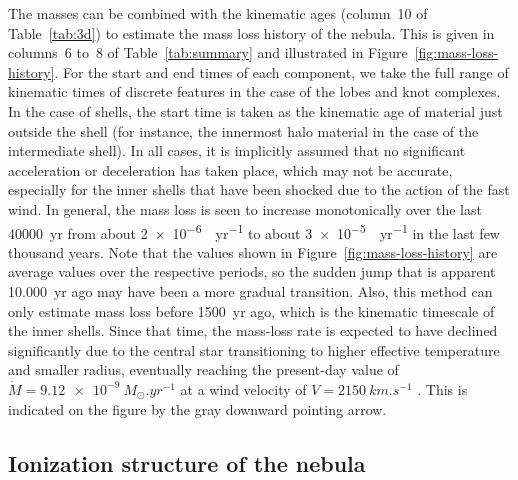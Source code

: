 \documentclass[useAMS, usenatbib]{mnras}
\begin{document}
The masses can be combined with the kinematic ages (column~10 of Table~\ref{tab:3d}) to estimate the mass loss history of the nebula.
This is given in columns~6 to~8 of Table~\ref{tab:summary} and illustrated in Figure~\ref{fig:mass-loss-history}.
For the start and end times of each component, we take the full range of kinematic times of discrete features in the case of the lobes and knot complexes.
In the case of shells, the start time is taken as the kinematic age of material just outside the shell (for instance, the innermost halo material in the case of the intermediate shell).
In all cases, it is implicitly assumed that no significant acceleration or deceleration has taken place,
which may not be accurate, especially for the inner shells that have been shocked due to the action of the fast wind.
In general, the mass loss is seen to increase monotonically over the last \SI{40000}{yr} from about \SI{2e-6}{\msun.yr^{-1}} to about \SI{3e-5}{\msun.yr^{-1}} in the last few thousand years.
Note that the values shown in Figure~\ref{fig:mass-loss-history} are average values over the respective periods,
so the sudden jump that is apparent \SI{10,000}{yr} ago may have been a more gradual transition.
Also, this method can only estimate mass loss before \SI{1500}{yr} ago, which is the kinematic timescale of the inner shells.
Since that time, the mass-loss rate is expected to have declined significantly
due to the central star transitioning to higher effective temperature and smaller radius,
eventually reaching the present-day value of \(\dot{M} = \SI{9.12e-9}{M_\odot.yr^{-1}}\) at a wind velocity of \(V = \SI{2150}{km.s^{-1}}\) \citep{Herald:2011a}.
This is indicated on the figure by the gray downward pointing arrow.


\subsection{Ionization structure of the nebula}
\label{sec:ioniz-struct-nebula}
\end{document}
